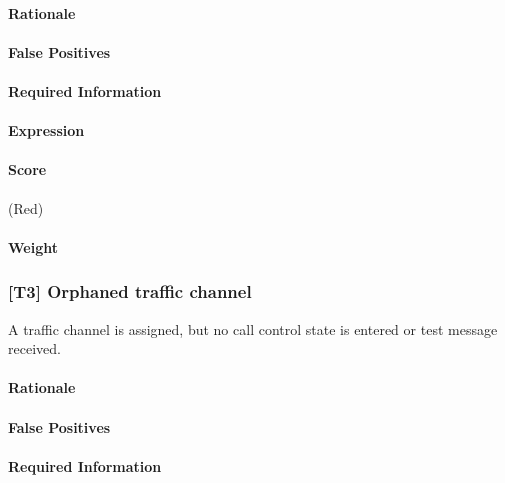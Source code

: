 \documentclass[a4paper,11pt,notitlepage,bigheadings,oneside]{scrartcl}
\begin{document}
\paragraph{Rationale}

\TBD{}

\paragraph{False Positives}

\TBD{}

\paragraph{Required Information}

\TBD{}

\paragraph{Expression}

\TBD{}

\paragraph{Score}

\TBD{} (Red)

\paragraph{Weight}

\TBD{}

\subsubsection{[T3] Orphaned traffic channel}

A traffic channel is assigned, but no call control state is entered or test
message received.

\paragraph{Rationale}

\TBD{}

\paragraph{False Positives}

\TBD{}

\paragraph{Required Information}
\end{document}
